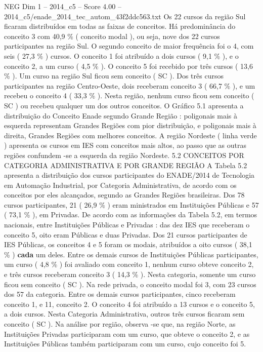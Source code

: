 \begin{textsample}{NEG Dim 1 – 2014\_c5 – Score 4.00 – 2014\_c5/enade\_2014\_tec\_autom\_43f2ddc563.txt}
Os 22 cursos da região Sul ficaram distribuídos em todas as faixas de conceitos.
Há predominância do conceito 3 com 40,9 \% ( conceito modal ), ou seja, nove dos 22 cursos participantes na região Sul.
O segundo conceito de maior frequência foi o 4, com seis ( 27,3 \% ) cursos.
O conceito 1 foi atribuído a dois cursos ( 9,1 \% ), e o conceito 2, a um curso ( 4,5 \% ).
O conceito 5 foi recebido por três cursos ( 13,6 \% ).
Um curso na região Sul ficou sem conceito ( SC ).
Dos três cursos participantes na região Centro-Oeste, dois receberam conceito 3 ( 66,7 \% ), e um recebeu o conceito 4 ( 33,3 \% ).
Nesta região, nenhum curso ficou sem conceito ( SC ) ou recebeu qualquer um dos outros conceitos.
O Gráfico 5.1 apresenta a distribuição do Conceito Enade segundo Grande Região : poligonais mais à esquerda representam Grandes Regiões com pior distribuição, e poligonais mais à direita, Grandes Regiões com melhores conceitos.
A região Nordeste ( linha verde ) apresenta os cursos em IES com conceitos mais altos, ao passo que as outras regiões confundem -se a esquerda da região Nordeste. 5.2 CONCEITOS POR CATEGORIA ADMINISTRATIVA E POR GRANDE REGIÃO A Tabela 5.2 apresenta a distribuição dos cursos participantes do ENADE/2014 de Tecnologia em Automação Industrial, por Categoria Administrativa, de acordo com os conceitos por eles alcançados, segundo as Grandes Regiões brasileiras.
Dos 78 cursos participantes, 21 ( 26,9 \% ) eram ministrados em Instituições Públicas e 57 ( 73,1 \% ), em Privadas.
De acordo com as informações da Tabela 5.2, em termos nacionais, entre Instituições Públicas e Privadas : das dez IES que receberam o conceito 5, oito eram Públicas e duas Privadas.
Dos 21 cursos participantes de IES Públicas, os conceitos 4 e 5 foram os modais, atribuídos a oito cursos ( 38,1 \% ) \textbf{cada} um deles.
Entre os demais cursos de Instituições Públicas participantes, um curso ( 4,8 \% ) foi avaliado com conceito 1, nenhum curso obteve conceito 2, e três cursos receberam conceito 3 ( 14,3 \% ).
Nesta categoria, somente um curso ficou sem conceito ( SC ).
Na rede privada, o conceito modal foi 3, com 23 cursos dos 57 da categoria.
Entre os demais cursos participantes, cinco receberam conceito 1, e 11, conceito 2.
O conceito 4 foi atribuído a 13 cursos e o conceito 5, a dois cursos.
Nesta Categoria Administrativa, outros três cursos ficaram sem conceito ( SC ).
Na análise por região, observa -se que, na região Norte, as Instituições Privadas participaram com um curso, que obteve o conceito 2, e as Instituições Públicas também participaram com um curso, cujo conceito foi 5.

\end{textsample}
